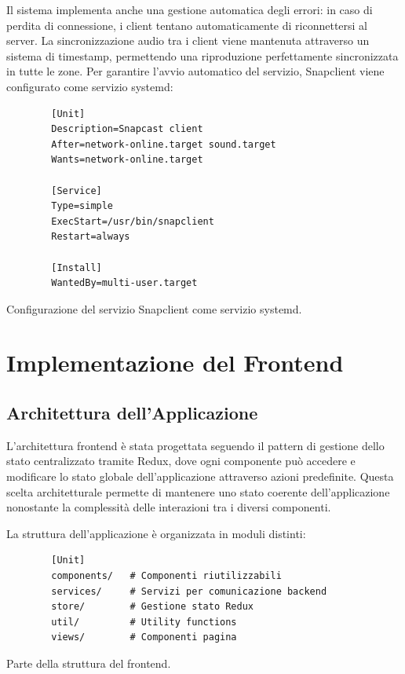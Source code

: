 Il sistema implementa anche una gestione automatica degli errori: in caso di perdita di connessione, i client tentano automaticamente di riconnettersi al server. La sincronizzazione audio tra i client viene mantenuta attraverso un sistema di timestamp, permettendo una riproduzione perfettamente sincronizzata in tutte le zone.
Per garantire l'avvio automatico del servizio, Snapclient viene configurato come servizio systemd:

\begin{table}[H]
  \begin{algorithm}[H]
    \caption{}
    \BlankLine
      \begin{verbatim}
        [Unit]
        Description=Snapcast client
        After=network-online.target sound.target
        Wants=network-online.target
  
        [Service]
        Type=simple
        ExecStart=/usr/bin/snapclient
        Restart=always
  
        [Install]
        WantedBy=multi-user.target
      \end{verbatim}
    \end{algorithm}
    \caption{Configurazione del servizio Snapclient come servizio systemd.}
    \label{tab:snapclient_service}
  \end{table}

\newpage
\section{Implementazione del Frontend}
\noindent


\subsection{Architettura dell'Applicazione}

L'architettura frontend è stata progettata seguendo il pattern di gestione dello stato centralizzato tramite Redux, dove ogni componente può accedere e modificare lo stato globale dell'applicazione attraverso azioni predefinite. Questa scelta architetturale permette di mantenere uno stato coerente dell'applicazione nonostante la complessità delle interazioni tra i diversi componenti.

La struttura dell'applicazione è organizzata in moduli distinti:

\begin{table}[H]
  \begin{algorithm}[H]
    \caption{}
    \BlankLine
      \begin{verbatim}
        [Unit]
        components/   # Componenti riutilizzabili
        services/     # Servizi per comunicazione backend
        store/        # Gestione stato Redux
        util/         # Utility functions
        views/        # Componenti pagina
      \end{verbatim}
    \end{algorithm}
    \caption{Parte della struttura del frontend.}
    \label{tab:frontend_struttura}
  \end{table}

